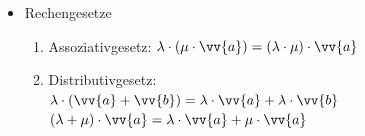 \begin{itemize}
\begin{enumerate}
\item Für $\lambda > 0$ hat er die gleiche Richtung wie $\vv{a}$ \\
\item Für $\lambda < 0$ hat er die entgegengesetzte Richtung wie $\vv{a}$
\end{enumerate}
\item Rechengesetze\\
\begin{enumerate}
\item Assoziativgesetz: $\lambda \cdot  \left(\mu \cdot \vv{a}\right) = \left(\lambda\cdot\mu\right)\cdot \vv{a}$\\
\item Distributivgesetz:\\ \hspace*{0.5cm} $\lambda \cdot \left(\vv{a} + \vv{b}\right) = \lambda \cdot \vv{a}+ \lambda \cdot \vv{b}$\\ \hspace*{0.5cm} $\left(\lambda + \mu \right)\cdot \vv{a} = \lambda \cdot \vv{a} + \mu \cdot \vv{a}$
\end{enumerate}
\end{itemize}
